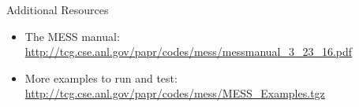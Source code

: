 \documentclass[10pt,presentation]{beamer}
\begin{document}
\begin{frame}{Additional Resources}
  \begin{itemize}
   \item The \textsc{MESS} manual: \url{http://tcg.cse.anl.gov/papr/codes/mess/messmanual_3_23_16.pdf}
   \item More examples to run and test: \url{http://tcg.cse.anl.gov/papr/codes/mess/MESS_Examples.tgz}
  \end{itemize}
\end{frame}



% 
% 
% 
% 
\end{document}
